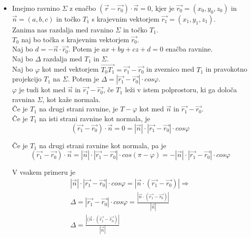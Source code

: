 \documentclass[a4paper,12pt]{article}
\begin{document}
\begin{itemize}
\item Imejmo ravnino $\Sigma$ z enačbo $(\vec{r} - \vec{r_0}) \cdot \vec{n} = 0$, kjer je $\vec{r_0} = (x_0,y_0,z_0)$ in $\vec{n} = (a,b,c)$ in točko $T_1$ s krajevnim vektorjem $\vec{r_1}=(x_1,y_1,z_1)$. \\

Zanima nas razdalja med ravnino $\Sigma$ in točko $T_1$. \\

$T_0$ naj bo točka s krajevnim vektorjem $\vec{r_0}$. \\

Naj bo $d=- \vec{n} \cdot \vec{r_0}$. Potem je $ax+by+cz+d=0$ enačba ravnine. \\

Naj bo $\Delta$ razdalja med $T_1$ in $\Sigma$. \\

Naj bo $\varphi$ kot med vektorjem $\overrightarrow{T_0 T_1} = \vec{r_1} - \vec{r_0} $ in zveznico med $T_1$ in pravokotno projekcijo $T_1$ na $\Sigma$. Potem je $\Delta = |\vec{r_1} - \vec{r_0}| \cdot cos\varphi $. \\

$\varphi$ je tudi kot med $\vec{n}$ in $\vec{r_1} - \vec{r_0} $, če $T_1$ leži v istem polprostoru, ki ga določa ravnina $\Sigma$, kot kaže normala. \\

Če je $T_1$ na drugi strani ravnine, je $T-\varphi$ kot med $\vec{n}$ in $\vec{r_1}-\vec{r_0}$. \\

Če je $T_1$ na isti strani ravnine kot normala, je $$(\vec{r_1}-\vec{r_0}) \cdot \vec{n}=0= |\vec{n}|\cdot|\vec{r_1}-\vec{r_0}|\cdot cos\varphi$$

Če je $T_1$ na drugi strani ravnine kot normala, pa je $$(\vec{r_1}-\vec{r_0}) \cdot \vec{n}= |\vec{n}|\cdot|\vec{r_1}-\vec{r_0}|\cdot cos(\pi - \varphi)=-|\vec{n}|\cdot|\vec{r_1}-\vec{r_0}|\cdot cos\varphi$$

V vsakem primeru je 
\begin{multline*}
|\vec{n}|\cdot|\vec{r_1}-\vec{r_0}|\cdot cos\varphi  = |\vec{n}\cdot(\vec{r_1}-\vec{r_0})|\Rightarrow \\ \Delta = |\vec{r_1}-\vec{r_0}|\cdot cos\varphi = \frac{|\vec{n}\cdot(\vec{r_1}-\vec{r_0})|}{|\vec{n}|}  \\ \Delta = \frac{|(\vec{n}\cdot(\vec{r_1}-\vec{r_0})|}{|\vec{n}|}
\end{multline*}


\end{itemize}
\end{document}

